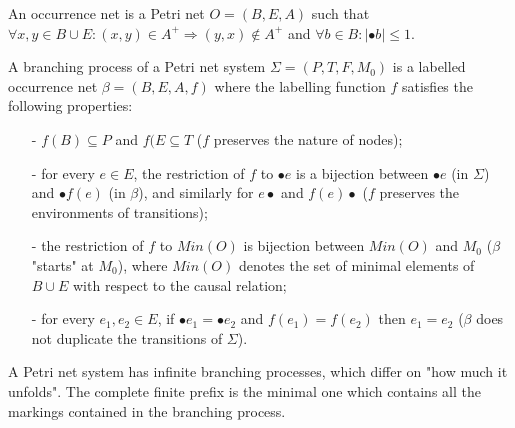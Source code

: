 \documentclass{llncs}
\begin{document}
\begin{definition}\label{def:occurrenceNet}
An occurrence net is a Petri net $O=(B,E,A)$ such that $\forall x,y\in B\cup E:(x,y)
\in A^{+}\Rightarrow(y,x)\notin A^{+}$ and $\forall b\in B:|\bullet b|\leq 1$.
\end{definition}

\begin{definition}\label{def:branchingProcess}
A branching process of a Petri net system $\Sigma=(P,T,F,M_{0})$ is a labelled occurrence net $\beta=(B,E,A,f)$ where the labelling function $f$ satisfies the following properties:
	\begin{itemize}
		\item[-] $f(B)\subseteq P$ and $f(E\subseteq T$ ($f$ preserves the nature of nodes);
		\item[-] for every $e\in E$, the restriction of $f$ to $\bullet e$ is a bijection between $\bullet e$ (in $\Sigma$) and $\bullet f(e)$ (in $\beta$), and similarly for $e\bullet$ and $f(e)\bullet$ ($f$ preserves the environments of transitions);
		\item[-] the restriction of $f$ to $Min(O)$ is bijection between $Min(O)$ and $M_{0}$ ($\beta$ "starts" at $M_{0}$), where $Min(O)$ denotes the set of minimal elements of $B\cup E$ with respect to the causal relation;
		\item[-] for every $e_{1},e_{2}\in E$, if $\bullet e_{1}=\bullet e_{2}$ and $f(e_{1})=f(e_{2})$ then $e_{1}=e_{2}$ ($\beta$ does not duplicate the transitions of $\Sigma$).
	\end{itemize}
\end{definition}

A Petri net system has infinite branching processes, which differ on "how much it unfolds". The complete finite prefix is the minimal one which contains all the markings contained in the branching process.
\end{document}
